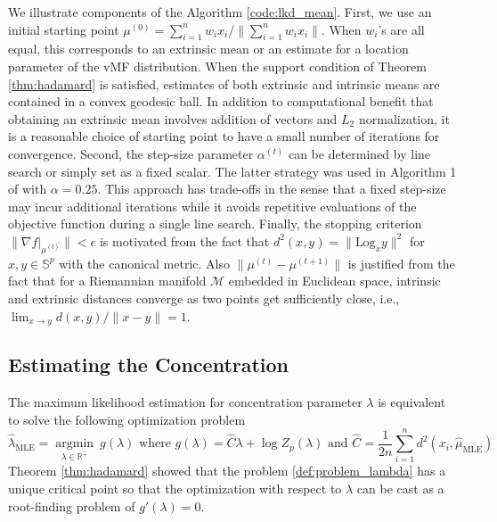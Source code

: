 \documentclass[11pt]{article}
\DeclareMathOperator*{\argmin}{argmin}
\newcommand{\calM}{\mathcal{M}}
\newcommand{\bbR}{\mathbb{R}}
\newcommand{\bbS}{\mathbb{S}}
\begin{document}
We illustrate components of the Algorithm \ref{code:lkd_mean}. First, we use an initial starting point $\mu^{(0)} = \sum_{i=1}^n w_i x_i / \| \sum_{i=1}^n w_i x_i\|$. When $w_i$'s are all equal, this corresponds to an extrinsic mean \citep{bhattacharya_nonparametric_2012-1} or an estimate for a location parameter of the vMF distribution. When the support condition of Theorem \ref{thm:hadamard} is satisfied, estimates of both extrinsic and intrinsic means are contained in a convex geodesic ball. In addition to computational benefit that obtaining an extrinsic mean involves addition of vectors and $L_2$ normalization, it is a reasonable choice of starting point to have a small number of iterations for convergence. Second, the step-size parameter $\alpha^{(t)}$ can be determined by line search or simply set as a fixed scalar. The latter strategy was used in Algorithm 1 of \cite{hauberg_directional_2018-1} with $\alpha=0.25$. This approach has trade-offs in the sense that a fixed step-size may incur additional iterations while it avoids repetitive evaluations of the objective function during a single line search. Finally, the stopping criterion $\|\nabla f \vert_{\mu^{(t)}} \| < \epsilon$ is motivated from the fact that $d^2(x,y) = \| \text{Log}_x y \|^2$ for $x,y\in \bbS^p$ with the canonical metric. Also $\| \mu^{(t)} - \mu^{(t+1)}\|$ is justified from the fact that for a Riemannian manifold $\calM$ embedded in Euclidean space, intrinsic and extrinsic distances converge as two points get sufficiently close, i.e.,  $\lim_{x\rightarrow y} d (x,y)/\|x-y\| =1$.







\subsection{Estimating the Concentration}

The maximum likelihood estimation for concentration parameter $\lambda$ is equivalent to solve the following optimization problem
\begin{equation*}
\hat{\lambda}_{\text{MLE}} =\underset{\lambda \in \bbR^+}{\argmin} ~ g(\lambda) \text{ where } g(\lambda) =\hat{C} \lambda + \log Z_p (\lambda)\text{ and } \hat{C} = \frac{1}{2n} \sum_{i=1}^n d^2(x_i, \hat{\mu}_{\text{MLE}})
\end{equation*}
Theorem \ref{thm:hadamard} showed that the problem \eqref{def:problem_lambda} has a unique critical point so that the optimization with respect to $\lambda$ can be cast as a  root-finding problem of $g'(\lambda)=0$. 
\end{document}
